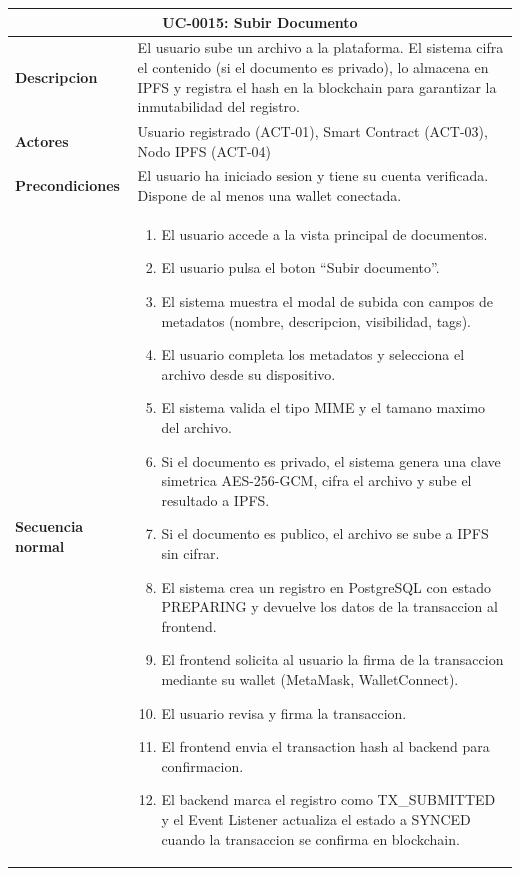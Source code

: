 \documentclass[11pt, a4paper]{article}
\begin{document}
\begin{table}[H]
\centering
\renewcommand{\arraystretch}{1.4}
\small
\begin{tabular}{|p{2.2cm}|p{9.5cm}|}
\hline
\multicolumn{2}{|c|}{\textbf{UC-0015: Subir Documento}} \\
\hline
\textbf{Descripcion} & El usuario sube un archivo a la plataforma. El sistema cifra el contenido (si el documento es privado), lo almacena en IPFS y registra el hash en la blockchain para garantizar la inmutabilidad del registro. \\
\hline
\textbf{Actores} & Usuario registrado (ACT-01), Smart Contract (ACT-03), Nodo IPFS (ACT-04) \\
\hline
\textbf{Precondiciones} & El usuario ha iniciado sesion y tiene su cuenta verificada. Dispone de al menos una wallet conectada. \\
\hline
\textbf{Secuencia normal} & 
\begin{enumerate}[nosep,leftmargin=*]
    \item El usuario accede a la vista principal de documentos.
    \item El usuario pulsa el boton ``Subir documento''.
    \item El sistema muestra el modal de subida con campos de metadatos (nombre, descripcion, visibilidad, tags).
    \item El usuario completa los metadatos y selecciona el archivo desde su dispositivo.
    \item El sistema valida el tipo MIME y el tamano maximo del archivo.
    \item Si el documento es privado, el sistema genera una clave simetrica AES-256-GCM, cifra el archivo y sube el resultado a IPFS.
    \item Si el documento es publico, el archivo se sube a IPFS sin cifrar.
    \item El sistema crea un registro en PostgreSQL con estado PREPARING y devuelve los datos de la transaccion al frontend.
    \item El frontend solicita al usuario la firma de la transaccion mediante su wallet (MetaMask, WalletConnect).
    \item El usuario revisa y firma la transaccion.
    \item El frontend envia el transaction hash al backend para confirmacion.
    \item El backend marca el registro como TX\_SUBMITTED y el Event Listener actualiza el estado a SYNCED cuando la transaccion se confirma en blockchain.

\end{enumerate}
\end{tabular}
\end{table}
\end{document}

